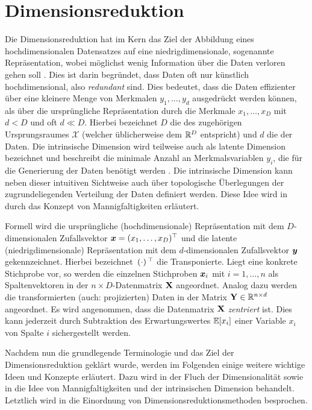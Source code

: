 \chapter{Dimensionsreduktion}
\label{ch:Dimensionsreduktion}

Die Dimensionsreduktion hat im Kern das Ziel der Abbildung eines hochdimensionalen Datensatzes auf
eine niedrigdimensionale, sogenannte  Repräsentation, wobei möglichst wenig
Information über die Daten verloren gehen soll \parencite[2]{Lee.2007}. Dies ist darin begründet, dass Daten oft nur künstlich hochdimensional, also
\textit{redundant} sind. Dies bedeutet, dass die Daten effizienter über eine kleinere Menge von
Merkmalen $y_1,\ldots,y_d$ ausgedrückt werden können, als über die ursprüngliche Repräsentation
durch die Merkmale $x_1,\ldots,x_D$ mit $d < D$ und oft $d \ll D$. Hierbei bezeichnet $D$ die
 des zugehörigen Ursprungsraumes $\mathcal{X}$ (welcher
üblicherweise dem $\mathbb{R}^D$ entspricht) und $d$ die  der Daten. Die
intrinsische Dimension wird teilweise auch als latente Dimension bezeichnet und beschreibt die
minimale Anzahl an Merkmalsvariablen $y_i$, die für die Generierung der Daten benötigt werden \parencite[47]{Lee.2007}. Die intrinsische Dimension kann neben dieser intuitiven Sichtweise auch über
topologische Überlegungen der zugrundeliegenden Verteilung der Daten definiert werden. Diese Idee
wird in  durch das Konzept von
Mannigfaltigkeiten erläutert.

Formell wird die ursprüngliche (hochdimensionale) Repräsentation mit dem $D$-dimensionalen
Zufallsvektor $\bm{x} = (x_1, \ldots, x_D)^\top$ und die latente (niedrigdimensionale)
Repräsentation mit dem $d$-dimensionalen Zufallsvektor $\bm{y}$ gekennzeichnet. Hierbei
bezeichnet $\,(\cdot)\,^\top$ die Transponierte. Liegt eine konkrete Stichprobe vor, so werden die
einzelnen Stichproben $\bm{x}_i$ mit $i = 1, \ldots,n$ als Spaltenvektoren in der $n \times
	D$-Datenmatrix $\mathbf{X}$ angeordnet. Analog dazu werden die transformierten (auch: projizierten)
Daten in der Matrix $\mathbf{Y} \in \mathbb{R}^{n \times d}$ angeordnet. Es wird angenommen, dass die
Datenmatrix $\mathbf{X}$ \textit{zentriert} ist. Dies kann jederzeit durch Subtraktion des
Erwartungswertes $\operatorname{\mathbb{E}}[x_i]$ einer Variable $x_i$ von Spalte $i$ sichergestellt werden.

Nachdem nun die grundlegende Terminologie und das Ziel der Dimensionsreduktion geklärt wurde,
werden im Folgenden einige weitere wichtige Ideen und Konzepte erläutert. Dazu wird in
 der Fluch der Dimensionalität sowie in
 die Idee von Mannigfaltigkeiten und
der intrinsischen Dimension behandelt. Letztlich wird in 
die Einordnung von Dimensionsreduktionsmethoden besprochen.

